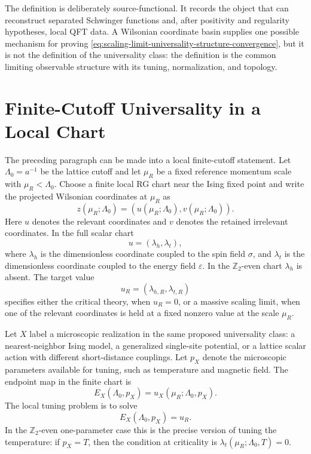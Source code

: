 The definition is deliberately source-functional.  It records the object that
can reconstruct separated Schwinger functions and, after positivity and
regularity hypotheses, local QFT data.  A Wilsonian coordinate basin supplies
one possible mechanism for proving
\eqref{eq:scaling-limit-universality-structure-convergence}, but it is not the
definition of the universality class: the definition is the common limiting
observable structure with its tuning, normalization, and topology.

\section{Finite-Cutoff Universality in a Local Chart}

The preceding paragraph can be made into a local finite-cutoff statement.
Let \(\Lambda_0=a^{-1}\) be the lattice cutoff and let \(\mu_R\) be a fixed
reference momentum scale with \(\mu_R<\Lambda_0\).  Choose a finite local RG
chart near the Ising fixed point and write the projected Wilsonian coordinates
at \(\mu_R\) as
\[
  z(\mu_R;\Lambda_0)=(u(\mu_R;\Lambda_0),v(\mu_R;\Lambda_0)).
\]
Here \(u\) denotes the relevant coordinates and \(v\) denotes the retained
irrelevant coordinates.  In the full scalar chart
\[
  u=(\lambda_h,\lambda_t),
\]
where \(\lambda_h\) is the dimensionless coordinate coupled to the spin field
\(\sigma\), and \(\lambda_t\) is the dimensionless coordinate coupled to the
energy field \(\varepsilon\).  In the \(\mathbb Z_2\)-even chart
\(\lambda_h\) is absent.  The target value
\[
  u_R=(\lambda_{h,R},\lambda_{t,R})
\]
specifies either the critical theory, when \(u_R=0\), or a massive scaling
limit, when one of the relevant coordinates is held at a fixed nonzero value
at the scale \(\mu_R\).

Let \(X\) label a microscopic realization in the same proposed universality
class: a nearest-neighbor Ising model, a generalized single-site potential, or
a lattice scalar action with different short-distance couplings.  Let
\(p_X\) denote the microscopic parameters available for tuning, such as
temperature and magnetic field.  The endpoint map in the finite chart is
\[
  E_X(\Lambda_0,p_X)
  =
  u_X(\mu_R;\Lambda_0,p_X).
\]
The local tuning problem is to solve
\[
  E_X(\Lambda_0,p_X)=u_R .
\]
In the \(\mathbb Z_2\)-even one-parameter case this is the precise version of
tuning the temperature: if \(p_X=T\), then the condition at criticality is
\(\lambda_t(\mu_R;\Lambda_0,T)=0\).

